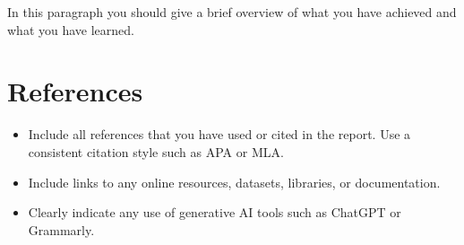 \documentclass[11pt]{article}
\begin{document}
In this paragraph you should give a brief overview of what you have achieved and what you have learned.

\section{References}

\begin{itemize}
    \item Include all references that you have used or cited in the report. Use a consistent citation style such as APA or MLA.
    \item Include links to any online resources, datasets, libraries, or documentation.
    \item Clearly indicate any use of generative AI tools such as ChatGPT or Grammarly.
\end{itemize}
\end{document}
